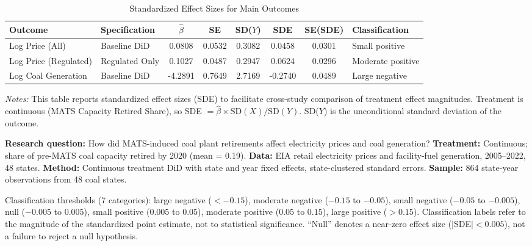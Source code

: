 \begin{table}[H]
\centering
\caption{Standardized Effect Sizes for Main Outcomes}
\label{tab:sde}
\begin{adjustbox}{max width=\textwidth}
\begin{tabular}{llcccccl}
\toprule
Outcome & Specification & $\hat{\beta}$ & SE & SD($Y$) & SDE & SE(SDE) & Classification \\
\midrule
Log Price (All) & Baseline DiD & 0.0808 & 0.0532 & 0.3082 & 0.0458 & 0.0301 & Small positive \\
Log Price (Regulated) & Regulated Only & 0.1027 & 0.0487 & 0.2947 & 0.0624 & 0.0296 & Moderate positive \\
Log Coal Generation & Baseline DiD & -4.2891 & 0.7649 & 2.7169 & -0.2740 & 0.0489 & Large negative \\
\bottomrule
\end{tabular}
\end{adjustbox}
\par\vspace{0.3em}
{\footnotesize \emph{Notes:} This table reports standardized effect sizes (SDE)
to facilitate cross-study comparison of treatment effect magnitudes.
Treatment is continuous (MATS Capacity Retired Share), so SDE $= \hat{\beta} \times \text{SD}(X) / \text{SD}(Y)$.
SD($Y$) is the unconditional standard deviation of the outcome.

\textbf{Research question:} How did MATS-induced coal plant retirements affect electricity prices and coal generation?
\textbf{Treatment:} Continuous; share of pre-MATS coal capacity retired by 2020 (mean = 0.19).
\textbf{Data:} EIA retail electricity prices and facility-fuel generation, 2005--2022, 48 states.
\textbf{Method:} Continuous treatment DiD with state and year fixed effects, state-clustered standard errors.
\textbf{Sample:} 864 state-year observations from 48 coal states.

Classification thresholds (7 categories):
large negative ($< -0.15$), moderate negative ($-0.15$ to $-0.05$),
small negative ($-0.05$ to $-0.005$), null ($-0.005$ to $0.005$),
small positive ($0.005$ to $0.05$), moderate positive ($0.05$ to $0.15$),
large positive ($> 0.15$).
Classification labels refer to the magnitude of the standardized point estimate,
not to statistical significance. ``Null'' denotes a near-zero effect size
($|$SDE$| < 0.005$), not a failure to reject a null hypothesis.}
\end{table}
